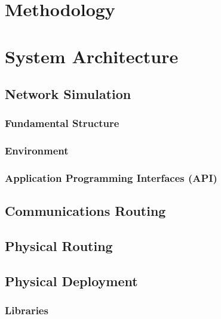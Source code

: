 \section{Methodology}
\section{System Architecture}
	\subsection{Network Simulation}
		\subsubsection{Fundamental Structure}
		\subsubsection{Environment}
		\subsubsection{Application Programming Interfaces (API)}
	\subsection{Communications Routing}
	\subsection{Physical Routing} 
	\subsection{Physical Deployment}
		\subsubsection{Libraries}